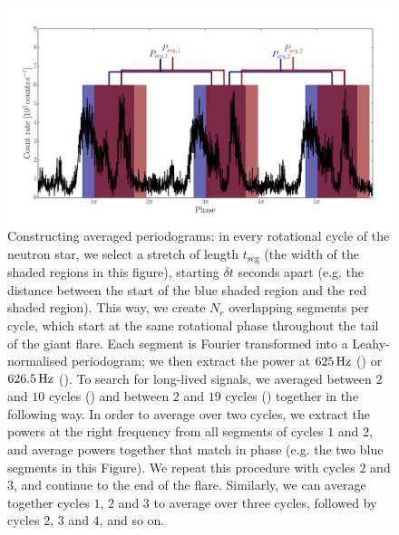 \documentclass{emulateapj}
\begin{document}
\begin{figure}[htbp]
\begin{center}
\includegraphics[width=15cm]{f1.pdf}
\caption{Constructing averaged periodograms: in every rotational cycle of the neutron star, we select a stretch of length $t_{\mathrm{seg}}$ (the width of the shaded regions in this figure), starting $\delta t$ seconds apart (e.g. the distance between the start of the blue shaded region and the red shaded region). This way, we create $N_r$ overlapping segments per cycle, which start at the same
 rotational phase throughout the tail of the giant flare. Each segment is Fourier transformed into a Leahy-normalised periodogram; we then extract the power at $625 \,\mathrm{Hz}$ (\rxte) or $626.5\,\mathrm{Hz}$ (\rhessi). To search for long-lived signals, we averaged between $2$ and $10$ cycles (\rxte) and between $2$ and $19$ cycles (\rhessi) together in the following way. In order to average over two cycles, we extract the powers at the right frequency from all segments of cycles $1$ and $2$, and average powers together that match in phase (e.g. the two blue segments in this Figure). We repeat this procedure with cycles $2$ and $3$, and continue to the end of the flare. Similarly, we can average together cycles $1$, $2$ and $3$ to average over three cycles, followed by cycles $2$, $3$ and $4$, and so on. }
\label{fig:analysis1}
\end{center}
\end{figure}
\end{document}
